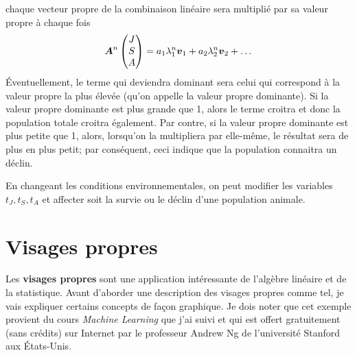 chaque vecteur propre de la combinaison linéaire sera multiplié par sa valeur propre à chaque fois
\[
\boldsymbol{A}^n
\begin{pmatrix}
J\\S\\A
\end{pmatrix}
= a_1 \lambda_1^n \boldsymbol{v}_1 + a_2 \lambda_2^n \boldsymbol{v}_2 + \ldots
\]
Éventuellement, le terme qui deviendra dominant sera celui qui correspond à la valeur propre la
plus élevée (qu'on appelle la valeur propre dominante).  Si la valeur propre dominante est
plus grande que 1, alors le terme croitra et donc la population totale croitra également.
Par contre, si la valeur propre dominante est plus petite que 1, alors, lorsqu'on la multipliera
par elle-même, le résultat sera de plus en plus petit; par conséquent, ceci indique que la population
connaitra un déclin.

En changeant les conditions environnementales, on peut modifier les variables $t_J, t_S, t_A$ et
affecter soit la survie ou le déclin d'une population animale.

\section{Visages propres}

Les \textbf{visages propres} sont une application intéressante de l'algèbre linéaire et de la statistique.
Avant d'aborder une description des visages propres comme tel, je vais expliquer certains concepts
de façon graphique. Je dois noter que cet exemple provient du cours 
\textit{Machine Learning} que j'ai suivi et qui est offert gratuitement (sans crédits) sur Internet
par le professeur Andrew Ng de l'université Stanford aux États-Unis.



